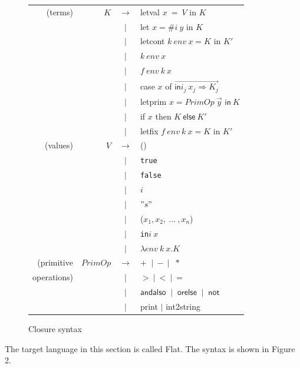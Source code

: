 \documentclass{article}
\theoremstyle{definition}
\theoremstyle{remark}
\numberwithin{equation}{section}
\begin{document}
\begin{figure}[!ht]
  \centering
\begin{tabular}{rrcl}
(terms) & $K$ & $\to$ & \textsf{letval }$x\ =\ V$ \textsf{ in } $K$ \\
        &     & $|$ & \textsf{let }$x = \texttt{\#}i\ y$\textsf{ in }$K$\\
        &     & $|$ & \textsf{letcont }$k\ env\ x = K$\textsf{ in }$K'$\\
        &     & $|$ &  $k\ env\ x$ \\
        &     & $|$ & $f\ env\ k\ x$ \\
        &     & $|$ & \textsf{case} $x$ \textsf{of}
             $\overrightarrow{\textsf{in}i_j\ x_j \Rightarrow K_j}$\\
        &     & $|$ & \textsf{letprim} $x=PrimOp\ \vec{y}
         \textsf{ in}\ K$\\
        &     & $|$ &\textsf{if} $x$ \textsf{then} $K\ \textsf{else}\ K'$\\
        &     & $|$ &\textsf{letfix }$f\ env\ k\ x=K$\textsf{ in }$K'$\\

(values) & $V$ & $\to$ & () \\
        &     & $|$ & \texttt{true}\\
        &     & $|$ & \texttt{false}\\
        &     & $|$ & $i$\\
        &     & $|$ & $"s"$\\
        &     & $|$ & ($x_1,x_2,\ ...\ , x_n$)\\
        &     & $|$ & \texttt{in}$i\ x$\\
        &     & $|$ &  $\lambda env\ k\ x.K$ \\

(primitive & $PrimOp$ & $\to$ & $+\ $ $|\ -\ |$ $\ *$\\
operations) &     & $|$ & $>\ |\ <\ |\ =$\\
        &     & $|$ & $\textsf{andalso }\ |\ \textsf{ orelse }\ |\ \textsf{ not}$\\
        &     & $|$ & \textsf{print} $|$ \textsf{int2string}\\
\end{tabular}
  \caption{Closure syntax}
  \label{fig-sub}
\end{figure}

The target language in this section is called Flat. The syntax is shown in Figure 2.
\end{document}
